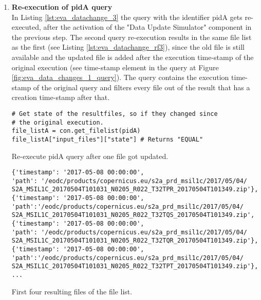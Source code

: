 \documentclass[draft,final]{vutinfth} %
\newenvironment{code}{\captionsetup{type=listing}}{}
\begin{document}
\begin{enumerate}
	\item \textbf{Re-execution of pidA query} \\
In Listing \ref{lst:eva_datachange_3} the query with the identifier pidA gets re-executed, after the activation of the "Data Update Simulator" component in the previous step. The second query re-execution results in the same file list as the first (see Listing \ref{lst:eva_datachange_rf3}), since the old file is still available and the updated file is added after the execution time-stamp of the original execution (see time-stamp element in the query at Figure \ref{fig:eva_data_changes_1_query}). The query contains the execution time-stamp of the original query and filters every file out of the result that has a creation time-stamp after that.
	\begin{code}
		\begin{verbatim}
# Get state of the resultfiles, so if they changed since 
# the original execution. 
file_listA = con.get_filelist(pidA)
file_listA["input_files"]["state"] # Returns "EQUAL"
		\end{verbatim}
		\caption{Re-execute pidA query after one file got updated.}
		\label{lst:eva_datachange_3}
	\end{code}

	\begin{code}
	\begin{verbatim}
{'timestamp': '2017-05-08 00:00:00', 
'path': '/eodc/products/copernicus.eu/s2a_prd_msil1c/2017/05/04/
S2A_MSIL1C_20170504T101031_N0205_R022_T32TPR_20170504T101349.zip'}, 
{'timestamp': '2017-05-08 00:00:00',
'path':'/eodc/products/copernicus.eu/s2a_prd_msil1c/2017/05/04/
S2A_MSIL1C_20170504T101031_N0205_R022_T32TQS_20170504T101349.zip', 
{'timestamp': '2017-05-08 00:00:00', 
'path': '/eodc/products/copernicus.eu/s2a_prd_msil1c/2017/05/04/
S2A_MSIL1C_20170504T101031_N0205_R022_T32TQR_20170504T101349.zip'}, 
{'timestamp': '2017-05-08 00:00:00',
'path':'/eodc/products/copernicus.eu/s2a_prd_msil1c/2017/05/04/
S2A_MSIL1C_20170504T101031_N0205_R022_T32TPT_20170504T101349.zip'},
...
	\end{verbatim}
	\caption{First four resulting files of the file list.}
	\label{lst:eva_datachange_rf3}
\end{code}
	

\end{enumerate}
\end{document}
